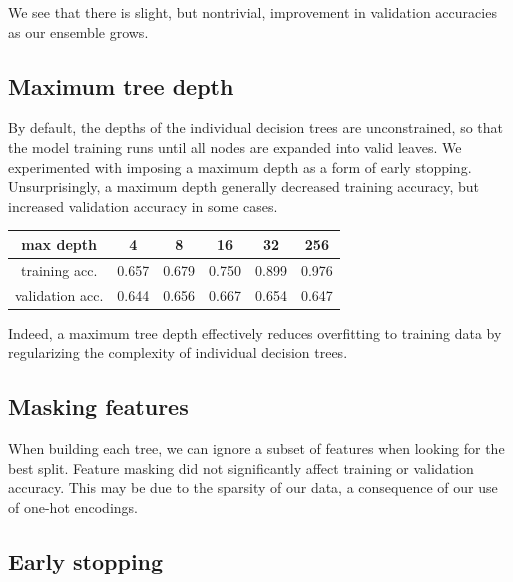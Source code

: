 \documentclass{article}
\begin{document}
\begin{multicols}{2}
We see that there is slight,
but nontrivial, improvement in validation accuracies
as our ensemble grows.

\subsection{Maximum tree depth}

By default,
the depths of the individual decision trees are unconstrained,
so that the model training runs until all nodes
are expanded into valid leaves.
We experimented with imposing a maximum depth
as a form of early stopping.
Unsurprisingly,
a maximum depth generally decreased training accuracy,
but increased validation accuracy
in some cases.
%
%
%
%
%
\begin{center}
    \begin{tabular}{c|ccccc}
        max depth &
          4 & 8 & 16 & 32 & 256 \\\hline
        training acc. &
          0.657 & 0.679 & 0.750 & 0.899 & 0.976\\
        validation acc. &
          0.644 & 0.656 & 0.667 & 0.654 & 0.647
    \end{tabular}
\end{center}
Indeed, a maximum tree depth effectively
reduces overfitting to training data
by regularizing the complexity of individual decision trees.

\subsection{Masking features}

When building each tree,
we can ignore a subset of features
when looking for the best split.
Feature masking did not significantly affect
training or validation accuracy.
This may be due to the sparsity of our data,
a consequence of our use of one-hot encodings.

\subsection{Early stopping}


\end{multicols}
\end{document}

